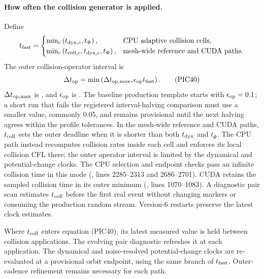 \paragraph{How often the collision generator is applied.}
Define
\[
 t_{\rm fast}=\begin{cases}
 \min_c\left(t_{{\rm dyn},c},t_\Phi\right),
 &\text{CPU adaptive collision cells},\\
 \min_c\left(t_{{\rm coll},c},t_{{\rm dyn},c},t_\Phi\right),
 &\text{mesh-wide reference and CUDA paths}.
 \end{cases}
\]
The outer collision-operator interval is
\[
 \Delta t_{\rm op}=
 \min\left(\Delta t_{\rm op,max},
            \epsilon_{\rm op}t_{\rm fast}\right).       \tag{PIC40}
\]
\(\Delta t_{\rm op,max}\) is
, and
\(\epsilon_{\rm op}\) is
.  The baseline production
template starts with \(\epsilon_{\rm op}=0.1\); a short run that fails the
registered interval-halving comparison must use a smaller value, commonly
0.05, and remains provisional until the next halving agrees within the
profile tolerances.  In the mesh-wide reference and CUDA paths,
\(t_{\rm coll}\) sets the outer deadline when it is shorter than both
\(t_{\rm dyn}\) and \(t_\Phi\).  The CPU
 path instead recomputes collision rates
inside each cell and enforces its local collision CFL there; the outer
operator interval is limited by the dynamical and potential-change clocks.
The CPU selection and endpoint checks pass an infinite collision time in this
mode (, lines 2285--2313 and
2686--2701).  CUDA retains the sampled collision time in its outer minimum
(, lines 1070--1083).
A diagnostic pair scan estimates \(t_{\rm coll}\)
before the first real event without changing markers or consuming the
production random stream.  Version-6 restarts preserve the latest clock
estimates.

Where \(t_{\rm coll}\) enters equation (PIC40), its latest measured value is
held between collision applications.  The evolving pair diagnostic refreshes
it at each application.  The dynamical and noise-resolved potential-change
clocks are re-evaluated at a provisional orbit endpoint, using the same
branch of \(t_{\rm fast}\).  Outer-cadence refinement remains necessary for
each path.

